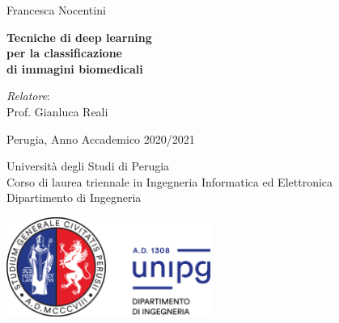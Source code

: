 \documentclass[15pt,a4paper]{report}
\begin{document}
\begin{titlepage}

{\Large \noindent Francesca Nocentini} \newline

\vspace{1cm}

{\begin{flushleft}
\fontsize{21.8}{26.16} \selectfont \bfseries \noindent 
Tecniche di deep learning \\
per la classificazione \\
di immagini biomedicali
\end{flushleft}}

\vspace{6mm}

{\large \noindent \emph{Relatore}: \vspace{1.0mm}\\ 
Prof. Gianluca Reali \newline}

\vspace{5cm}


\noindent Perugia, Anno Accademico 2020/2021 

\noindent Università degli Studi di Perugia \\
Corso di laurea triennale in Ingegneria Informatica ed Elettronica \\
Dipartimento di Ingegneria

\vspace{0.7cm}

\noindent \includegraphics[width=0.5\textwidth]{figures/logounipg2021.png}
\restoregeometry
\end{titlepage}
\normalfont
\newpage \thispagestyle{empty} \ \newpage
\onehalfspacing
\tableofcontents

\end{document}
